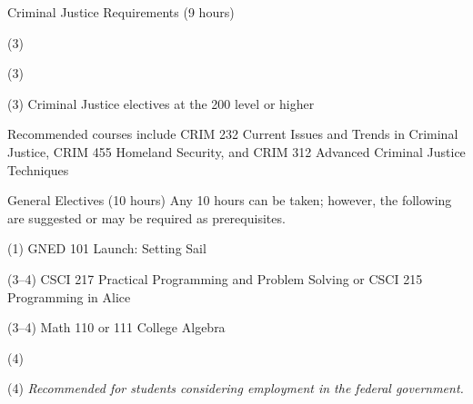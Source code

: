 \begin{reqgroup}{Criminal Justice Requirements (9 hours)}
\begin{checklist}
\begin{minipage}[t]{0.5\linewidth}
	\item (3) 
\end{minipage}
\begin{minipage}[t]{0.5\linewidth}
	\item (3) 
	\item (3) Criminal Justice electives at the 200 level or higher
\end{minipage}
\end{checklist}
Recommended courses include CRIM 232 Current Issues and Trends in Criminal Justice,
CRIM 455 Homeland Security, and CRIM 312 Advanced Criminal Justice Techniques
\end{reqgroup}

\begin{reqgroup}{General Electives (10 hours)}
Any 10 hours can be taken; however, the following are suggested or may be required as prerequisites.
\begin{checklist}
\begin{minipage}[t]{\linewidth}
	\item (1)	GNED 101	Launch: Setting Sail
	\item (3--4)	CSCI 217	Practical Programming and Problem Solving or CSCI 215	Programming in Alice
	\item (3--4) Math 110 or 111 College Algebra
	\item (4) 
	\item (4)  \em{Recommended for students considering employment in the federal government.}
\end{minipage}
\end{checklist}
\end{reqgroup}

